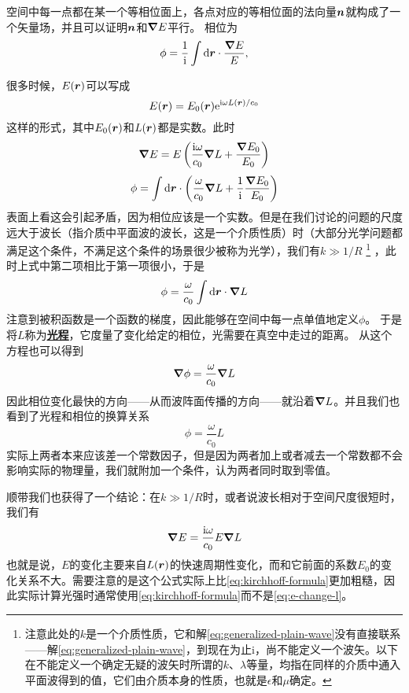 \documentclass[UTF8, a4paper]{ctexart}
\newcommand*{\ii}{\mathrm{i}}
\newcommand*{\ee}{\mathrm{e}}
\newcommand*{\concept}[1]{\underline{\textbf{#1}}}
\begin{document}
空间中每一点都在某一个等相位面上，各点对应的等相位面的法向量$\vb*{n}$就构成了一个矢量场，并且可以证明$\vb*{n}$和$\grad{E}$平行。
相位为
\[
    \phi = \frac{1}{\ii} \int \dd{\vb*{r}} \cdot \frac{\grad{E}}{E},
\]

很多时候，$E(\vb*{r})$可以写成
\begin{equation}
    E(\vb*{r}) = E_0(\vb*{r})\ee^{\ii \omega L(\vb*{r}) / c_0}
    \label{eq:generalized-plain-wave}
\end{equation}
这样的形式，其中$E_0(\vb*{r})$和$L(\vb*{r})$都是实数。此时
\[
    \grad{E} = E \left(\frac{\ii \omega}{c_0} \grad{L} + \frac{\grad{E_0}}{E_0}\right)
\]
\[
    \phi = \int \dd{\vb*{r}} \cdot \left( \frac{\omega}{c_0} \grad{L} + \frac{1}{\ii} \frac{\grad{E_0}}{E_0} \right) 
\]
表面上看这会引起矛盾，因为相位应该是一个实数。但是在我们讨论的问题的尺度远大于波长（指介质中平面波的波长，这是一个介质性质）时（大部分光学问题都满足这个条件，不满足这个条件的场景很少被称为光学），我们有$k \gg 1/R$%
\footnote{注意此处的$k$是一个介质性质，它和解\eqref{eq:generalized-plain-wave}没有直接联系——解\eqref{eq:generalized-plain-wave}，到现在为止i，尚不能定义一个波矢。以下在不能定义一个确定无疑的波矢时所谓的$k$、$\lambda$等量，均指在同样的介质中通入平面波得到的值，它们由介质本身的性质，也就是$\epsilon$和$\mu$确定。}
，此时上式中第二项相比于第一项很小，于是
\begin{equation}
    \phi = \frac{\omega}{c_0} \int \dd{\vb*{r}} \cdot \grad{L}
    \label{eq:phrase-change}
\end{equation}
注意到被积函数是一个函数的梯度，因此能够在空间中每一点单值地定义$\phi$。
于是将$L$称为\concept{光程}，它度量了变化给定的相位，光需要在真空中走过的距离。
从这个方程也可以得到
\[
    \grad{\phi} = \frac{\omega}{c_0} \grad{L}
\]
因此相位变化最快的方向——从而波阵面传播的方向——就沿着$\grad{L}$。并且我们也看到了光程和相位的换算关系
\begin{equation}
    \phi = \frac{\omega}{c_0} L
\end{equation}
实际上两者本来应该差一个常数因子，但是因为两者加上或者减去一个常数都不会影响实际的物理量，我们就附加一个条件，认为两者同时取到零值。

顺带我们也获得了一个结论：在$k \gg 1/R$时，或者说波长相对于空间尺度很短时，我们有
\begin{equation}
    \grad{E} = \frac{\ii \omega}{c_0} E \grad{L}
    \label{eq:e-change-l}
\end{equation}
也就是说，$E$的变化主要来自$L(\vb*{r})$的快速周期性变化，而和它前面的系数$E_0$的变化关系不大。需要注意的是这个公式实际上比\eqref{eq:kirchhoff-formula}更加粗糙，因此实际计算光强时通常使用\eqref{eq:kirchhoff-formula}而不是\eqref{eq:e-change-l}。
\end{document}

